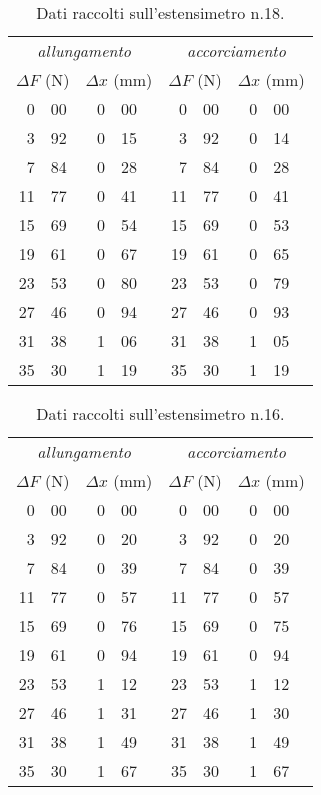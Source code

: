 \begin{table}[hp]\caption{Dati raccolti sull'estensimetro n.18.}\label{tab18}
\centering \small
\begin{tabular}{*4{r@{.}l}}
\multicolumn{4}{c}{\emph{allungamento}} & \multicolumn{4}{c}{\emph{accorciamento}}\\
\multicolumn{2}{c}{$\Delta F$ (\unit{N})}
&\multicolumn{2}{c}{$\Delta x$ (\unit{mm})}
&\multicolumn{2}{c}{$\Delta F$ (\unit{N})}
&\multicolumn{2}{c}{$\Delta x$ (\unit{mm})}\\\hline
0&00 &0&00 &0&00 &0&00\\
3&92 &0&15 &3&92 &0&14\\
7&84 &0&28 &7&84 &0&28\\
11&77 &0&41 &11&77 &0&41\\
15&69 &0&54 &15&69 &0&53\\
19&61 &0&67 &19&61 &0&65\\
23&53 &0&80 &23&53 &0&79\\
27&46 &0&94 &27&46 &0&93\\
31&38 &1&06 &31&38 &1&05\\
35&30 &1&19 &35&30 &1&19\\
\end{tabular}
\end{table}
\begin{table}[hp]\caption{Dati raccolti sull'estensimetro n.16.}\label{tab16}
\centering \small
\begin{tabular}{*4{r@{.}l}}
\multicolumn{4}{c}{\emph{allungamento}} & \multicolumn{4}{c}{\emph{accorciamento}}\\
\multicolumn{2}{c}{$\Delta F$ (\unit{N})}
&\multicolumn{2}{c}{$\Delta x$ (\unit{mm})}
&\multicolumn{2}{c}{$\Delta F$ (\unit{N})}
&\multicolumn{2}{c}{$\Delta x$ (\unit{mm})}\\\hline
0&00 &0&00 &0&00 &0&00\\
3&92 &0&20 &3&92 &0&20\\
7&84 &0&39 &7&84 &0&39\\
11&77 &0&57 &11&77 &0&57\\
15&69 &0&76 &15&69 &0&75\\
19&61 &0&94 &19&61 &0&94\\
23&53 &1&12 &23&53 &1&12\\
27&46 &1&31 &27&46 &1&30\\
31&38 &1&49 &31&38 &1&49\\
35&30 &1&67 &35&30 &1&67\\
\end{tabular}
\end{table}
